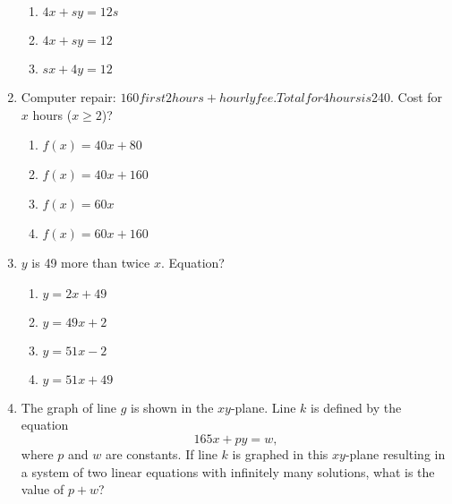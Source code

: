 \documentclass[12pt]{exam}
\begin{document}
\begin{enumerate}
\begin{enumerate}[label=\Alph*)]
        \item $4x + sy = 12s$
        \item $4x + sy = 12$
        \item $sx + 4y = 12$
    \end{enumerate}
    \item Computer repair: $160 first 2 hours + hourly fee. Total for 4 hours is $240. Cost for $x$ hours ($x \geq 2$)?
    \begin{enumerate}[label=\Alph*)]
        \item $f(x) = 40x + 80$
        \item $f(x) = 40x + 160$
        \item $f(x) = 60x$
        \item $f(x) = 60x + 160$
    \end{enumerate}
    \item $y$ is 49 more than twice $x$. Equation?
    \begin{enumerate}[label=\Alph*)]
        \item $y = 2x + 49$
        \item $y = 49x + 2$
        \item $y = 51x - 2$
        \item $y = 51x + 49$
    \end{enumerate}
    \item The graph of line $g$ is shown in the $xy$-plane. Line $k$ is defined by the equation
\[
165x + py = w,
\]
where $p$ and $w$ are constants. If line $k$ is graphed in this $xy$-plane resulting in a system of two linear equations with infinitely many solutions, what is the value of $p + w$?

\begin{center}
\end{center}
\end{enumerate}
\end{document}
